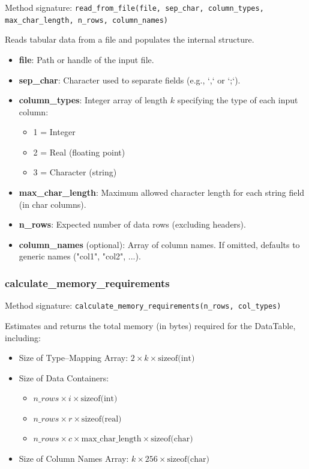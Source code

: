 \documentclass{article}
\begin{document}
Method signature: \texttt{read\_from\_file(file, sep\_char, column\_types, max\_char\_length, n\_rows, column\_names)}

Reads tabular data from a file and populates the internal structure.

\begin{itemize}
    \item \textbf{file}: Path or handle of the input file.
    \item \textbf{sep\_char}: Character used to separate fields (e.g., `,` or `;`).
    \item \textbf{column\_types}: Integer array of length \( k \) specifying the type of each input column:
    \begin{itemize}
        \item 1 = Integer
        \item 2 = Real (floating point)
        \item 3 = Character (string)
    \end{itemize}
    \item \textbf{max\_char\_length}: Maximum allowed character length for each string field (in char columns).
    \item \textbf{n\_rows}: Expected number of data rows (excluding headers).
    \item \textbf{column\_names} (optional): Array of column names. If omitted, defaults to generic names ("col1", "col2", ...).
\end{itemize}

\subsubsection*{calculate\_memory\_requirements}

Method signature: \texttt{calculate\_memory\_requirements(n\_rows, col\_types)}

Estimates and returns the total memory (in bytes) required for the DataTable, including:

\begin{itemize}
    \item Size of Type--Mapping Array: \( 2 \times k \times \text{sizeof(int)} \)
    \item Size of Data Containers:
    \begin{itemize}
        \item \( n\_rows \times i \times \text{sizeof(int)} \)
        \item \( n\_rows \times r \times \text{sizeof(real)} \)
        \item \( n\_rows \times c \times \text{max\_char\_length} \times \text{sizeof(char)} \)
    \end{itemize}
    \item Size of Column Names Array: \( k \times 256 \times \text{sizeof(char)} \)
\end{itemize}
\end{document}

